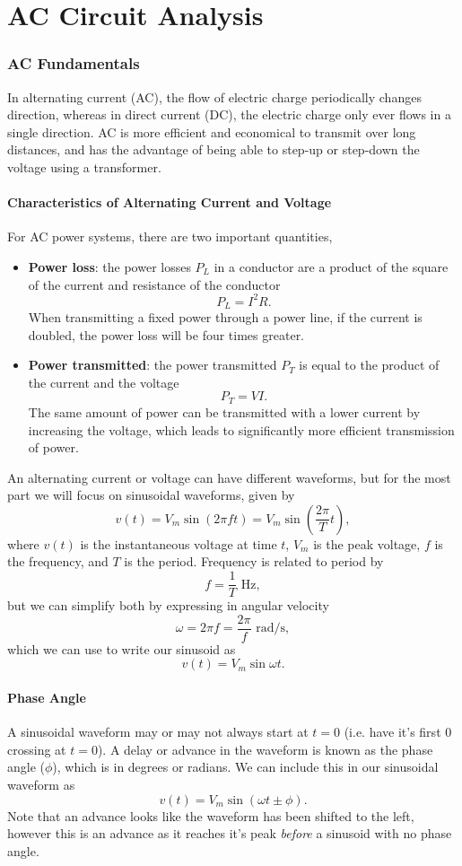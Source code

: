 \documentclass{article}
\begin{document}
\part{AC Circuit Analysis}
\section{AC Fundamentals}
In alternating current (AC), the flow of electric charge periodically changes direction, whereas in direct current (DC), the electric charge only ever flows in a single direction. AC is more efficient and economical to transmit over long distances, and has the advantage of being able to step-up or step-down the voltage using a transformer.

\subsection{Characteristics of Alternating Current and Voltage}
For AC power systems, there are two important quantities,
\begin{itemize}
    \item \textbf{Power loss}: the power losses $P_L$ in a conductor are a product of the square of the current and resistance of the conductor 
    \[
        P_L=I^2R.
    \]
    When transmitting a fixed power through a power line, if the current is doubled, the power loss will be four times greater.
\item \textbf{Power transmitted}: the power transmitted $P_T$ is equal to the product of the current and the voltage 
\[
    P_T=VI.
\]
The same amount of power can be transmitted with a lower current by increasing the voltage, which leads to significantly more efficient transmission of power.
\end{itemize}
An alternating current or voltage can have different waveforms, but for the most part we will focus on sinusoidal waveforms, given by 
\[
    v(t)=V_m \sin \left( 2\pi ft \right)=V_m \sin \left( \frac{2\pi }{T}t \right),
\]
where $v(t)$ is the instantaneous voltage at time $t$, $V_m$ is the peak voltage, $f$ is the frequency, and $T$ is the period. Frequency is related to period by 
\[
    f=\frac{1}{T} \text{ Hz},
\]
but we can simplify both by expressing in angular velocity 
\[
    \omega =2\pi f=\frac{2\pi }{f}\text{ rad/s},
\]
which we can use to write our sinusoid as 
\[
    v(t)=V_m \sin\omega t.
\]

\subsection{Phase Angle}
A sinusoidal waveform may or may not always start at $t=0$ (i.e. have it's first 0 crossing at $t=0$). A delay or advance in the waveform is known as the phase angle ($\phi $), which is in degrees or radians. We can include this in our sinusoidal waveform as 
\[
    v(t)=V_m \sin \left( \omega t\pm\phi  \right).
\]
Note that an advance looks like the waveform has been shifted to the left, however this is an advance as it reaches it's peak \textit{before} a sinusoid with no phase angle.
\end{document}
